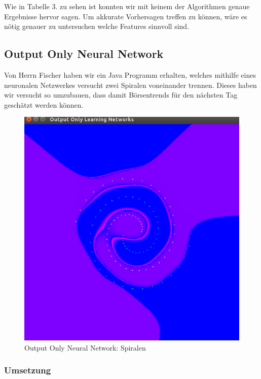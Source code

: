 \documentclass[12pt]{article} %
\begin{document}
Wie in Tabelle 3. zu sehen ist konnten wir mit keinem der Algorithmen genaue Ergebnisse hervor sagen. Um akkurate Vorhersagen treffen zu können, wäre es nötig genauer zu untersuchen welche Features sinnvoll sind.

\subsection{Output Only Neural Network}

Von Herrn Fischer haben wir ein Java Programm erhalten, welches mithilfe eines neuronalen Netzwerkes versucht zwei Spiralen voneinander trennen. Dieses haben wir versucht so umzubauen, dass damit Börsentrends für den nächsten Tag geschätzt werden können.

\begin{figure}[!h]  
  \begin{center}
    \includegraphics[width=\textwidth]{spirals}
  \end{center}
      \caption{Output Only Neural Network: Spiralen}
\end{figure}

\subsubsection{Umsetzung}
\end{document}
